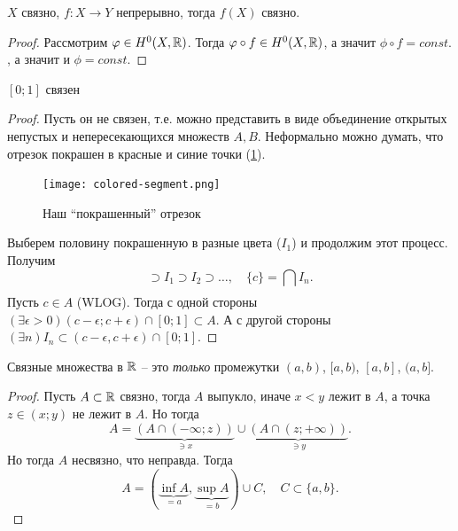\begin{theorem}
    $X$ связно, $f\colon X \to Y$ непрерывно, тогда $f(X)$ связно.
\end{theorem}
\begin{proof}
    Рассмотрим $\varphi\in H^0(X, \mathbb R)$. Тогда $\varphi \circ f \in H^0(X, \mathbb R)$, а значит $\phi\circ f = const.$, а значит и $\phi = const.$
\end{proof}

\begin{theorem}
    $[0; 1]$ связен 
\end{theorem}
\begin{proof}
    Пусть он не связен, т.е. можно представить в виде объединение открытых непустых и непересекающихся множеств $A, B$. Неформально можно думать, что отрезок покрашен в красные и синие точки (\cref{fig:colored-segment}). 
    \begin{figure}[ht]
        \centering
        \texttt{[image: colored-segment.png]}
        \caption{Наш ``покрашенный'' отрезок}
        \label{fig:colored-segment}
    \end{figure}
    Выберем половину покрашенную в разные цвета ($I_1$) и продолжим этот процесс. Получим \begin{equation}
        [0,1] \supset I_1 \supset I_2 \supset \ldots, \quad \{c\} = \bigcap_{} I_n.
    \end{equation} Пусть $c \in A$ (WLOG). Тогда с одной стороны $(\exists \epsilon > 0) (c-\epsilon; c+\epsilon) \cap [0;1] \subset A.$ А с другой стороны $(\exists n ) I_n \subset (c-\epsilon, c+\epsilon) \cap [0;1].$
\end{proof}

\begin{example}
    Связные множества в $\mathbb R$ -- это \emph{только} промежутки $(a,b)$, $[a, b)$, $[a,b]$, $(a,b]$.
\end{example}
\begin{proof}
    Пусть $A \subset \mathbb R$ связно, тогда $A$ выпукло, иначе $x < y$ лежит в $A$, а точка $z \in (x;y)$ не лежит в $A$. Но тогда \begin{equation}
        A = \underbrace{(A\cap(-\infty; z))}_{\ni x}\cup\underbrace{(A \cap (z; +\infty))}_{\ni y}. 
    \end{equation}
    Но тогда $A$ несвязно, что неправда. Тогда \begin{equation}
        A = (\underbrace{\inf A}_{=a}, \underbrace{\sup A}_{=b})\cup C, \quad C \subset \{a, b\}.
    \end{equation}
\end{proof}